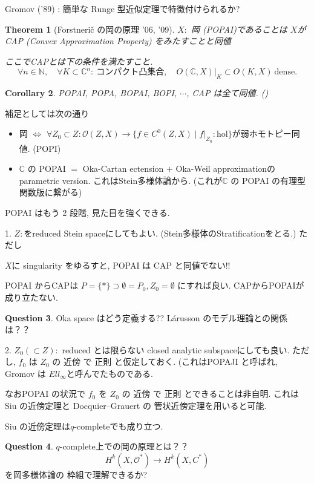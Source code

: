 \documentclass[dvipdfmx,a4paper,11pt]{article} %
\newtheorem{thm}{Theorem}[section]
\newtheorem{cor}[thm]{Corollary}
\theoremstyle{definition}
\newtheorem{ques}[thm]{Question}
\theoremstyle{remark}
\numberwithin{equation}{section}
\begin{document}
Gromov ('89) : 簡単な Runge 型近似定理で特徴付けられるか?

\begin{thm}[Forstnerič の岡の原理 '06, '09]
\(X:\) 岡 (POPAI)であることは
$X$が CAP (Convex Approximation Property) をみたすことと同値

ここでCAPとは下の条件を満たすこと.
\[
\forall n\in\mathbb N,\quad
\forall K\subset \mathbb C^n:\ \text{コンパクト凸集合},\quad
O(\mathbb C,X)|_K\subset O(K,X)\ \mathrm{dense}.
\]
\end{thm}

\begin{cor}
 POPAI, POPA, BOPAI, BOPI, \(\cdots\), CAP は全て同値.
()
\end{cor}

補足としては次の通り
\begin{itemize}
\item 岡 \(\Longleftrightarrow\)
\(\forall Z_0\subset Z: 
\mathcal{O}(Z,X)\longrightarrow
\{f\in C^0(Z,X)\mid f|_{Z_0}:\mathrm{hol}\}
\)が弱ホモトピー同値. (POPI)
\item \(\mathbb C\) の POPAI \(=\) Oka-Cartan ectension \(+\) Oka-Weil approximationの parametric version. これはStein多様体論から. (これが\(\mathbb C\) の POPAI の有理型関数版に繋がる)
\end{itemize}

POPAI はもう 2 段階, 見た目を強くできる.

1. \(Z:\)をreduced Stein spaceにしてもよい. (Stein多様体のStratificationをとる.)
ただし
\begin{tcolorbox}[mybox]
$X$に singularity をゆるすと, POPAI は CAP と同値でない!!
\end{tcolorbox}
POPAI からCAPは
\(P=\{*\}\supset \emptyset=P_0, Z_0=\emptyset\) にすれば良い. CAPからPOPAIが成り立たない.

\begin{ques}
 Oka space はどう定義する?? Lárusson のモデル理論との関係は？？
\end{ques}


2. \(Z_0(\subset Z):\) reduced とは限らない closed analytic subspaceにしても良い. 
ただし, \(f_0\) は \(Z_0\) の 近傍 で 正則 と仮定しておく.
(これはPOPAJI と呼ばれ, Gromov は $Ell_{\infty}$と呼んでたものである. 

なおPOPAI の状況で \(f_0\) を \(Z_0\) の 近傍 で 正則 とできることは非自明.
これはSiu の近傍定理と Docquier--Grauert の 管状近傍定理を用いると可能. 

Siu の近傍定理は$q$-completeでも成り立つ.
\begin{ques}
$q$-complete上での岡の原理とは？？
\[
H^k(X,\mathcal{O}^*)\longrightarrow H^k(X,C^*)
\]
を岡多様体論の
枠組で理解できるか?
\end{ques}
\end{document}
